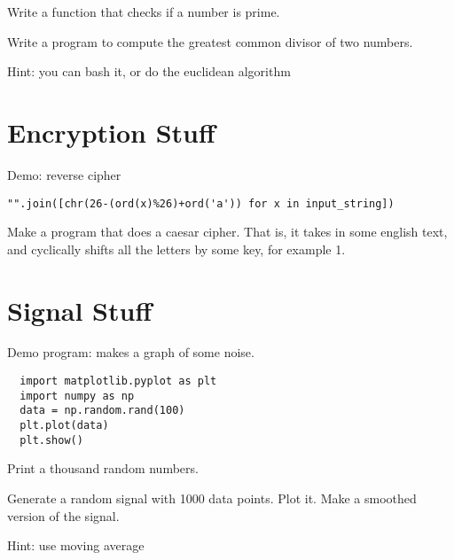 \documentclass{article}[11pt]
\begin{document}
\begin{q}
  Write a function that checks if a number is prime.
\end{q}

\begin{q}
  Write a program to compute the greatest common divisor of 
  two numbers.

  Hint: you can bash it, or do the euclidean algorithm
\end{q}






\section{Encryption Stuff}
Demo: reverse cipher
\begin{lstlisting}
"".join([chr(26-(ord(x)%26)+ord('a')) for x in input_string])
\end{lstlisting}

\begin{q}
  Make a program that does a caesar cipher. That is, it takes in some english text, and cyclically shifts all the letters by some key, for example 1.
\end{q}


\section{Signal Stuff}
Demo program: makes a graph of some noise.  
\begin{lstlisting}
  import matplotlib.pyplot as plt
  import numpy as np
  data = np.random.rand(100)
  plt.plot(data)
  plt.show()
\end{lstlisting}

\begin{q}
  Print a thousand random numbers.
\end{q}

\begin{q}
  Generate a random signal with 1000 data points. Plot it. Make a smoothed version of the signal.

  Hint: use moving average
\end{q}
\end{document}
